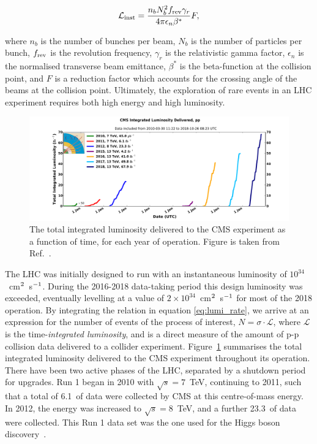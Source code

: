 \begin{equation}\label{eq:inst_lumi}
    \mathcal{L}_{\rm{inst}} = \frac{n_bN_b^2f_{\rm{rev}}\gamma_r}{4\pi\epsilon_n\beta^*}F,
\end{equation}

\noindent
where $n_b$ is the number of bunches per beam, $N_b$ is the number of particles per bunch, $f_{\rm{rev}}$ is the revolution frequency, $\gamma_r$ is the relativistic gamma factor, $\epsilon_n$ is the normalised transverse beam emittance, $\beta^*$ is the beta-function at the collision point, and $F$ is a reduction factor which accounts for the crossing angle of the beams at the collision point. Ultimately, the exploration of rare events in an LHC experiment requires both high energy and high luminosity.

\begin{figure}[htb!]
  \centering
  \includegraphics[width=1\textwidth]{Figures/cms/luminosity.pdf}
  \caption[The total integrated luminosity delivered to the CMS experiment]
  {
    The total integrated luminosity delivered to the CMS experiment as a function of time, for each year of operation.
    Figure is taken from Ref.~\cite{CMSLumiPublic}.
  }
  \label{fig:luminosity}
\end{figure}

The LHC was initially designed to run with an instantaneous luminosity of $10^{34}$~cm$^{\rm{2}}$~s$^{\rm{-1}}$. During the 2016-2018 data-taking period this design luminosity was exceeded, eventually levelling at a value of $2 \times 10^{34}$~cm$^{\rm{2}}$~s$^{\rm{-1}}$ for most of the 2018 operation. By integrating the relation in equation \ref{eq:lumi_rate}, we arrive at an expression for the number of events of the process of interest, $N=\sigma\cdot\mathcal{L}$, where $\mathcal{L}$ is the time-\textit{integrated luminosity}, and is a direct measure of the amount of p-p collision data delivered to a collider experiment. Figure~\ref{fig:luminosity} summarises the total integrated luminosity delivered to the CMS experiment throughout its operation. There have been two active phases of the LHC, separated by a shutdown period for upgrades. Run 1 began in 2010 with $\sqrt{s}=7$~TeV, continuing to 2011, such that a total of 6.1~\fbinv of data were collected by CMS at this centre-of-mass energy. In 2012, the energy was increased to $\sqrt{s}=8$~TeV, and a further 23.3~\fbinv of data were collected. This Run 1 data set was the one used for the Higgs boson discovery~\cite{Aad:2012tfa,Chatrchyan:2012xdj,Chatrchyan:2013lba}. 

